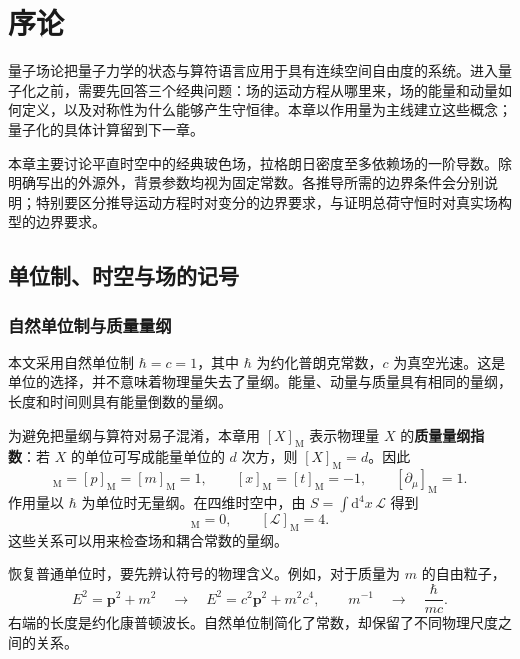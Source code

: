 \chapter{序论}
\label{chap:prelude}

量子场论把量子力学的状态与算符语言应用于具有连续空间自由度的系统。进入量子化之前，需要先回答三个经典问题：场的运动方程从哪里来，场的能量和动量如何定义，以及对称性为什么能够产生守恒律。本章以作用量为主线建立这些概念；量子化的具体计算留到下一章。

本章主要讨论平直时空中的经典玻色场，拉格朗日密度至多依赖场的一阶导数。除明确写出的外源外，背景参数均视为固定常数。各推导所需的边界条件会分别说明；特别要区分推导运动方程时对变分的边界要求，与证明总荷守恒时对真实场构型的边界要求。

\section{单位制、时空与场的记号}
\label{sec:prelude-conventions}

\subsection{自然单位制与质量量纲}

本文采用自然单位制 $\hbar=c=1$，其中 $\hbar$ 为约化普朗克常数，$c$ 为真空光速。这是单位的选择，并不意味着物理量失去了量纲。能量、动量与质量具有相同的量纲，长度和时间则具有能量倒数的量纲。

为避免把量纲与算符对易子混淆，本章用 $[X]_{\mathrm{M}}$ 表示物理量 $X$ 的\textbf{质量量纲指数}：若 $X$ 的单位可写成能量单位的 $d$ 次方，则 $[X]_{\mathrm{M}}=d$。因此
\begin{equation}
  [E]_{\mathrm{M}}=[p]_{\mathrm{M}}=[m]_{\mathrm{M}}=1,
  \qquad [x]_{\mathrm{M}}=[t]_{\mathrm{M}}=-1,
  \qquad [\partial_{\mu}]_{\mathrm{M}}=1.
\end{equation}
作用量以 $\hbar$ 为单位时无量纲。在四维时空中，由
$S=\int\mathrm{d}^{4}x\,\mathcal{L}$ 得到
\begin{equation}
  [S]_{\mathrm{M}}=0,\qquad [\mathcal{L}]_{\mathrm{M}}=4.
\end{equation}
这些关系可以用来检查场和耦合常数的量纲。

恢复普通单位时，要先辨认符号的物理含义。例如，对于质量为 $m$ 的自由粒子，
\begin{equation}
  E^{2}=\bm{p}^{2}+m^{2}
  \quad\longrightarrow\quad
  E^{2}=c^{2}\bm{p}^{2}+m^{2}c^{4},
  \qquad m^{-1}\quad\longrightarrow\quad\frac{\hbar}{mc}.
\end{equation}
右端的长度是约化康普顿波长。自然单位制简化了常数，却保留了不同物理尺度之间的关系。


